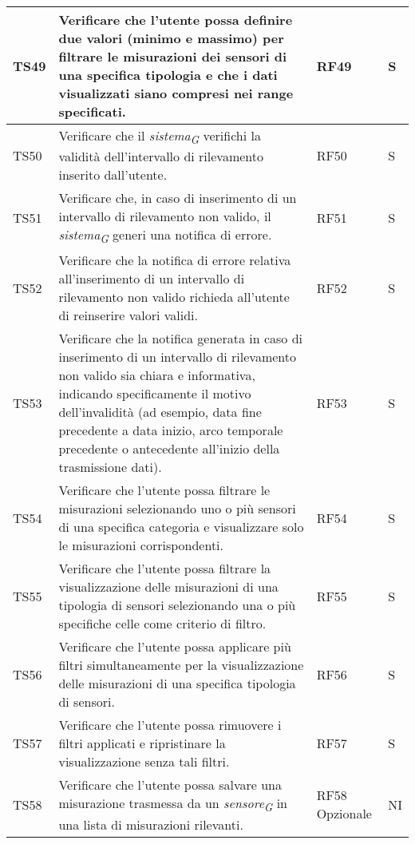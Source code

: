 \begin{longtable}{|C{1.9cm}|L{5cm}|C{2cm}|C{2cm}|}
    TS49 & Verificare che l'utente possa definire due valori (minimo e massimo) per filtrare le misurazioni dei sensori di una specifica tipologia e che i dati visualizzati siano compresi nei range specificati. & RF49 & S \\
    \hline

    TS50 & Verificare che il \textit{sistema}\textsubscript{\textit{G}} verifichi la validità dell'intervallo di rilevamento inserito dall'utente. & RF50 & S \\
    \hline

    TS51 & Verificare che, in caso di inserimento di un intervallo di rilevamento non valido, il \textit{sistema}\textsubscript{\textit{G}} generi una notifica di errore. & RF51 & S \\
    \hline

    TS52 & Verificare che la notifica di errore relativa all'inserimento di un intervallo di rilevamento non valido richieda all'utente di reinserire valori validi. & RF52 & S \\
    \hline

    TS53 & Verificare che la notifica generata in caso di inserimento di un intervallo di rilevamento non valido sia chiara e informativa, indicando specificamente il motivo dell'invalidità (ad esempio, data fine precedente a data inizio, arco temporale precedente o antecedente all’inizio della trasmissione dati). & RF53 & S \\
    \hline

    TS54 & Verificare che l'utente possa filtrare le misurazioni selezionando uno o più sensori di una specifica categoria e visualizzare solo le misurazioni corrispondenti. & RF54 & S \\
    \hline

    TS55 & Verificare che l'utente possa filtrare la visualizzazione delle misurazioni di una tipologia di sensori selezionando una o più specifiche celle come criterio di filtro. & RF55 & S \\
    \hline

    TS56 & Verificare che l'utente possa applicare più filtri simultaneamente per la visualizzazione delle misurazioni di una specifica tipologia di sensori. & RF56 & S \\
    \hline

    TS57 & Verificare che l'utente possa rimuovere i filtri applicati e ripristinare la visualizzazione senza tali filtri. & RF57 & S \\
    \hline

    TS58 & Verificare che l'utente possa salvare una misurazione trasmessa da un \textit{sensore}\textsubscript{\textit{G}} in una lista di misurazioni rilevanti. & RF58 Opzionale & NI \\
    \hline


\end{longtable}
